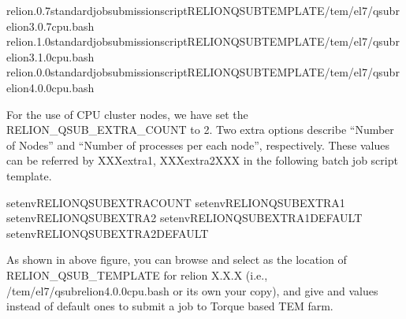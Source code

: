 \documentclass[a4paper,10pt,english]{sphinxmanual}
\begin{document}
\begin{sphinxVerbatim}[commandchars=\\\{\}]
relion.0.7standardjobsubmissionscriptRELION\PYGZus{}QSUB\PYGZus{}TEMPLATE/tem/el7/qsub\PYGZhy{}relion\PYGZhy{}3.0.7\PYGZhy{}cpu.bash
relion.1.0standardjobsubmissionscriptRELION\PYGZus{}QSUB\PYGZus{}TEMPLATE/tem/el7/qsub\PYGZhy{}relion\PYGZhy{}3.1.0\PYGZhy{}cpu.bash
relion.0.0standardjobsubmissionscriptRELION\PYGZus{}QSUB\PYGZus{}TEMPLATE/tem/el7/qsub\PYGZhy{}relion\PYGZhy{}4.0.0\PYGZhy{}cpu.bash
\end{sphinxVerbatim}

\sphinxAtStartPar
For the use of CPU cluster nodes, we have set the RELION\_QSUB\_EXTRA\_COUNT to 2. Two extra options describe “Number of Nodes” and “Number of processes per each node”, respectively. These values can be referred by XXXextra1, XXXextra2XXX in the following batch job script template.

\begin{sphinxVerbatim}[commandchars=\\\{\}]
setenvRELION\PYGZus{}QSUB\PYGZus{}EXTRA\PYGZus{}COUNT
setenvRELION\PYGZus{}QSUB\PYGZus{}EXTRA1
setenvRELION\PYGZus{}QSUB\PYGZus{}EXTRA2
setenvRELION\PYGZus{}QSUB\PYGZus{}EXTRA1\PYGZus{}DEFAULT
setenvRELION\PYGZus{}QSUB\PYGZus{}EXTRA2\PYGZus{}DEFAULT
\end{sphinxVerbatim}


\sphinxAtStartPar
As shown in above figure, you can browse and select  as the location of RELION\_QSUB\_TEMPLATE for relion X.X.X (i.e., /tem/el7/qsub\sphinxhyphen{}relion\sphinxhyphen{}4.0.0\sphinxhyphen{}cpu.bash or its own your copy),
and give  and  values instead of default ones to submit a job to Torque based TEM farm.
\end{document}
